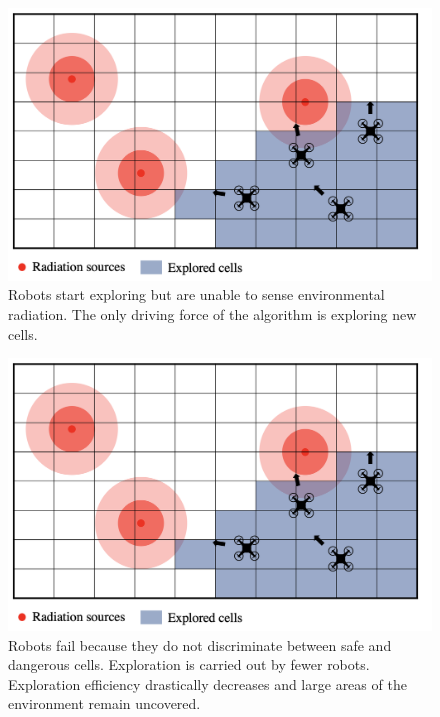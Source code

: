 \begin{figure}
     \includegraphics[width=16cm]{figures/dora_explorer/risk_aware_b.png}
     \caption[Risk-unawareness intuition (1)]{Robots start exploring but are unable to sense environmental radiation. The only driving force of the algorithm is exploring new cells.}
     \label{risk_unaware_a}
\end{figure}

\begin{figure}
     \includegraphics[width=16cm]{figures/dora_explorer/risk_aware_b.png}
     \caption[Risk-unawareness intuition (2)]{Robots fail because they do not discriminate between safe and dangerous cells. Exploration is carried out by fewer robots. Exploration efficiency drastically decreases and large areas of the environment remain uncovered.}
     \label{risk_unaware_b}
\end{figure}

